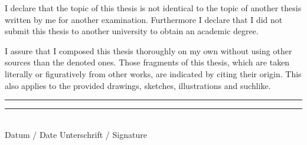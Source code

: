 \documentclass[11pt, a4paper]{article}
\begin{document}
\vspace{2cm}
I declare that the topic of this thesis is not identical to the topic of another thesis written by me for another examination. Furthermore I declare that I did not submit this thesis to another university to obtain an academic degree.

\vspace{0.8cm}
I assure that I composed this thesis thoroughly on my own without using other sources than the denoted ones. Those fragments of this thesis, which are taken literally or figuratively from other works, are indicated by citing their origin. This also applies to the provided drawings, sketches, illustrations and suchlike.

\vspace{1.5cm}
\rule[0.05cm]{5cm}{0.5pt} \hspace{4.5cm} \rule[0.05cm]{5cm}{0.5pt}\\
Datum / Date \hspace{7.1cm} Unterschrift / Signature
\end{document}
